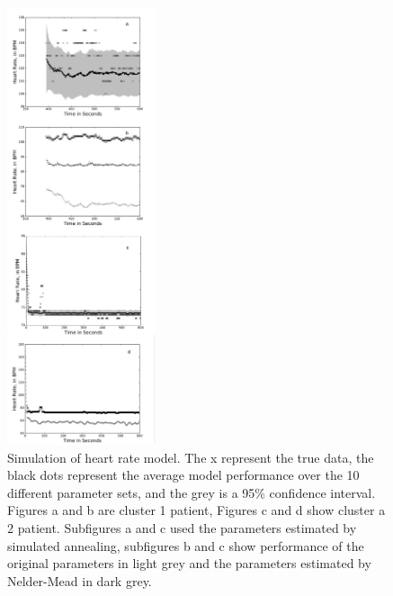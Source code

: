 \documentclass[12pt]{article}
\begin{document}
\begin{figure}
  \includegraphics[width=0.39\textwidth]{./figs/Fig_OOmodelincol.pdf}
  \caption{Simulation of heart rate model. The x represent the true data, the black dots represent the average model performance over the 10 different parameter sets, and the grey is a 95\% confidence interval. Figures a and b are cluster 1 patient, Figures c and d show cluster a 2 patient. Subfigures a and c used the parameters estimated by simulated annealing, subfigures b and c show performance of the original parameters in light grey and the parameters estimated by Nelder-Mead in dark grey.}\label{fig:mulitobjperformance}
\end{figure}
\end{document}
